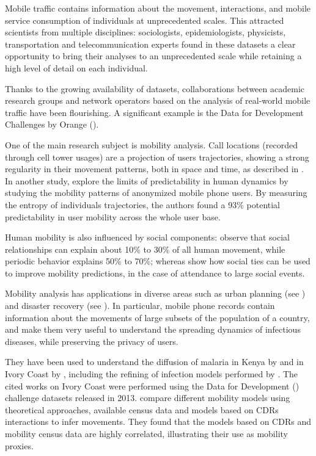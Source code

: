 Mobile traffic contains information about the movement, interactions, and mobile service consumption of individuals at unprecedented scales.
This attracted scientists from multiple disciplines:
sociologists, epidemiologists, physicists, transportation and telecommunication experts
found in these datasets a clear opportunity to bring their analyses to an unprecedented scale while retaining a high level of detail on each individual.

Thanks to the growing availability of datasets, collaborations between academic research groups and network operators based on the analysis of real-world mobile traffic have been flourishing. A significant example is the Data for Development Challenges by Orange (\cite{d4d}).

One of the main research subject is mobility analysis.
Call locations (recorded through cell tower usages) are a projection of users trajectories,
showing a strong regularity in their movement patterns,
both in space and time, as described in \cite{gonzalez2008understanding}.
In another study, \cite{song2010limits} explore the limits of predictability in human dynamics by studying the mobility patterns of anonymized mobile phone users.
By measuring the entropy of individuals trajectories, the authors found a 93\% potential predictability in user mobility across the whole user base.

Human mobility is also influenced by social components: \cite{cho2011friendship} observe that social relationships
can explain about 10\% to 30\% of all human movement, while periodic
behavior explains 50\% to 70\%; whereas \cite{ponieman2016mobility} show how social ties can be used to improve mobility predictions, in the case of attendance to large social events.

Mobility analysis has applications in diverse areas such as urban planning (see \cite{wang2012understanding})  and disaster recovery (see \cite{lu2012predictability}).
In particular, mobile phone records contain information about the movements of large subsets of the population of a country, and make them very useful to understand the spreading dynamics of infectious diseases, while preserving the privacy of users.

They have been used to understand the diffusion of malaria in Kenya by \cite{wesolowski2012quantifying} and in Ivory Coast by \cite{enns2013human}, including the refining of infection models performed by \cite{chunara2013large}. The cited works on Ivory Coast were performed using the Data for Development (\cite{d4d}) challenge datasets released in 2013. \cite{tizzoni2014use} compare different mobility models using theoretical approaches, available census data and models based on CDRs interactions to infer movements. They found that the models based on CDRs and mobility census data are highly correlated, illustrating their use as mobility proxies.

